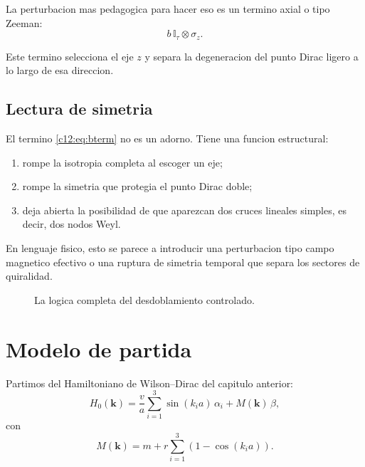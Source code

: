 La perturbacion mas pedagogica para hacer eso es un termino axial o tipo Zeeman:
\begin{equation}
b\,\mathbb{I}_\tau\otimes \sigma_z.
\label{c12:eq:bterm}
\end{equation}

Este termino selecciona el eje \(z\) y separa la degeneracion del punto Dirac ligero a lo largo de esa direccion.

\subsection{Lectura de simetria}
El termino \eqref{c12:eq:bterm} no es un adorno. Tiene una funcion estructural:
\begin{enumerate}[label=\arabic*.]
    \item rompe la isotropia completa al escoger un eje;
    \item rompe la simetria que protegia el punto Dirac doble;
    \item deja abierta la posibilidad de que aparezcan dos cruces lineales simples, es decir, dos nodos Weyl.
\end{enumerate}

En lenguaje fisico, esto se parece a introducir una perturbacion tipo campo magnetico efectivo o una ruptura de simetria temporal que separa los sectores de quiralidad.

\begin{figure}[h!]
\centering
{}
\caption{La logica completa del desdoblamiento controlado.}
\end{figure}

\section{Modelo de partida}
Partimos del Hamiltoniano de Wilson--Dirac del capitulo anterior:
\begin{equation}
H_0(\bm{k})=
\frac{v}{a}\sum_{i=1}^3 \sin(k_i a)\,\alpha_i
+
M(\bm{k})\,\beta,
\label{c12:eq:H0}
\end{equation}
con
\begin{equation}
M(\bm{k}) = m + r\sum_{i=1}^3 \left(1-\cos(k_i a)\right).
\label{c12:eq:Mk}
\end{equation}

